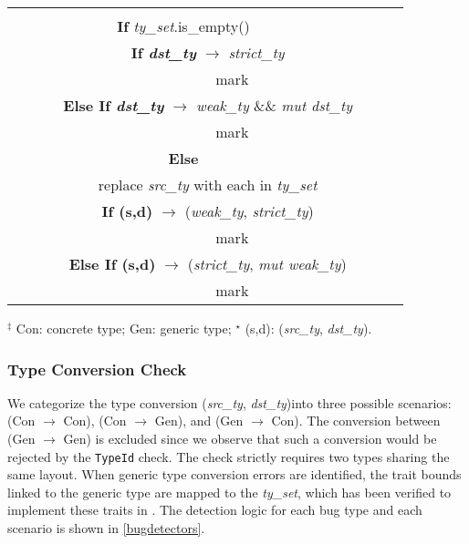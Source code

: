 \begin{table*}[t]
\begin{threeparttable}
\begin{tabular}{c l l l}
 \thead[l]{
 \textbf{Input}: \textit{dst\_ty}, \textit{ty\_set} \\
 \textbf{If} \textit{ty\_set}.is\_empty() \\
 ~ ~ ~ ~ \textbf{If \textit{dst\_ty}} $\rightarrow$ \textit{strict\_ty} \\
 ~ ~ ~ ~ ~ ~ ~ ~ mark \\
 ~ ~ ~ ~ \textbf{Else If \textit{dst\_ty}} $\rightarrow$ \textit{weak\_ty} \&\& \textit{mut dst\_ty} \\
 ~ ~ ~ ~ ~ ~ ~ ~ mark \\
 \textbf{Else} \\
 ~ ~ ~ ~ replace \textit{src\_ty} with each in \textit{ty\_set} \\
 ~ ~ ~ ~ \textbf{If (s,d)} $\rightarrow$ (\textit{weak\_ty}, \textit{strict\_ty}) \\
 ~ ~ ~ ~ ~ ~ ~ ~ mark \\
 ~ ~ ~ ~ \textbf{Else If (s,d)} $\rightarrow$ (\textit{strict\_ty}, \textit{mut weak\_ty}) \\
 ~ ~ ~ ~ ~ ~ ~ ~ mark } \\

 \bottomrule
\end{tabular}
\begin{tablenotes}
    \footnotesize
    \item $^\ddagger$ Con: concrete type; Gen: generic type; $^\star$ (s,d): (\textit{src\_ty}, \textit{dst\_ty}).
\end{tablenotes}
\end{threeparttable}
\label{bugdetectors}
\end{table*}












\subsubsection{Type Conversion Check}
We categorize the type conversion (\textit{src\_ty}, \textit{dst\_ty})into three possible scenarios: (Con $\rightarrow$ Con), (Con $\rightarrow$ Gen), and (Gen $\rightarrow$ Con).
% 
The conversion between (Gen $\rightarrow$ Gen) is excluded since we observe that such a conversion would be rejected by the \texttt{TypeId} check\cite{TypeIdin2:online}. The check strictly requires two types sharing the same layout.
%
{When generic type conversion errors are identified, the trait bounds linked to the generic type are  mapped to the \textit{ty\_set}, which has been verified to implement these traits in \tyanalyzer.}
%
The detection logic for each bug type and each scenario is shown in \autoref{bugdetectors}. 





















